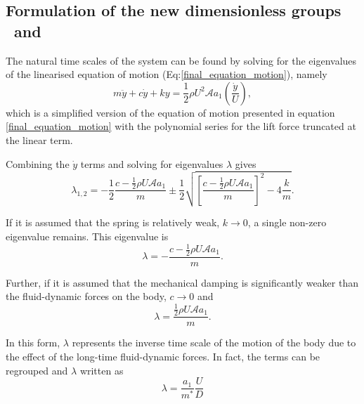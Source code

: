 \subsection{Formulation of the new dimensionless groups \massstiff \ and \massdamp}
\label{sec:newvar}


The natural time scales of the system can be found by solving for the eigenvalues of the linearised equation of motion (Eq:\ref{final_equation_motion}), namely
\begin{equation}
	\label{eqn:eom_linear}
	m\ddot{y}{+}c\dot{y}{+}ky{=}\frac{1}{2}\rho U^2 \mathcal{A} a_1\left(\frac{\dot{y}}{U}\right),
\end{equation}
which is a simplified version of the equation of motion presented in equation \ref{final_equation_motion} with the polynomial series for the lift force truncated at the linear term.

Combining the $\dot{y}$ terms and solving for eigenvalues $\lambda$ gives
\begin{equation}
	\label{eqn:eigs}
	\lambda_{1,2}= -\frac{1}{2}\frac{c-\frac{1}{2}\rho U\mathcal{A}a_1}{m}\pm\frac{1}{2}\sqrt{\left[\frac{c-\frac{1}{2}\rho U\mathcal{A}a_1}{m}\right]^2-4\frac{k}{m}}.
\end{equation}

If it is assumed that the spring is relatively weak, $k\rightarrow 0$, a single non-zero eigenvalue remains. This eigenvalue is
\begin{equation}
	\label{eqn:eigs_nospring}
	\lambda=-\frac{c-\frac{1}{2}\rho U\mathcal{A}a_1}{m}.
\end{equation}

Further, if it is assumed that the mechanical damping is significantly weaker than the fluid-dynamic forces on the body, $c\rightarrow 0$ and
\begin{equation}
	\label{eqn:eigs_nospring_nodamp}
	\lambda=\frac{\frac{1}{2}\rho U\mathcal{A}a_1}{m}.
\end{equation}


In this form, $\lambda$ represents the inverse time scale of the motion of the body due to the effect of the long-time fluid-dynamic forces. In fact, the terms can be regrouped and $\lambda$ written as
\begin{equation}
	\label{eqn:timescale}
	\lambda = \frac{a_1}{m^*}\frac{U}{D}
\end{equation}

